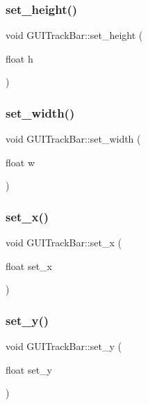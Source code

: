 \subsubsection{\texorpdfstring{set\+\_\+height()}{set\_height()}}
{\footnotesize\ttfamily void G\+U\+I\+Track\+Bar\+::set\+\_\+height (\begin{DoxyParamCaption}\item[{float}]{h }\end{DoxyParamCaption})}

\hypertarget{class_g_u_i_track_bar_ab5cedd6c9d836a56af4cbc4c19200e1d}{}\label{class_g_u_i_track_bar_ab5cedd6c9d836a56af4cbc4c19200e1d} 
\subsubsection{\texorpdfstring{set\+\_\+width()}{set\_width()}}
{\footnotesize\ttfamily void G\+U\+I\+Track\+Bar\+::set\+\_\+width (\begin{DoxyParamCaption}\item[{float}]{w }\end{DoxyParamCaption})}

\hypertarget{class_g_u_i_track_bar_ae40cba720f026868c654ebbd62fde8a0}{}\label{class_g_u_i_track_bar_ae40cba720f026868c654ebbd62fde8a0} 
\subsubsection{\texorpdfstring{set\+\_\+x()}{set\_x()}}
{\footnotesize\ttfamily void G\+U\+I\+Track\+Bar\+::set\+\_\+x (\begin{DoxyParamCaption}\item[{float}]{set\+\_\+x }\end{DoxyParamCaption})}

\hypertarget{class_g_u_i_track_bar_a0bfc78a20b823b228fd6a13215acfe22}{}\label{class_g_u_i_track_bar_a0bfc78a20b823b228fd6a13215acfe22} 
\subsubsection{\texorpdfstring{set\+\_\+y()}{set\_y()}}
{\footnotesize\ttfamily void G\+U\+I\+Track\+Bar\+::set\+\_\+y (\begin{DoxyParamCaption}\item[{float}]{set\+\_\+y }\end{DoxyParamCaption})}

